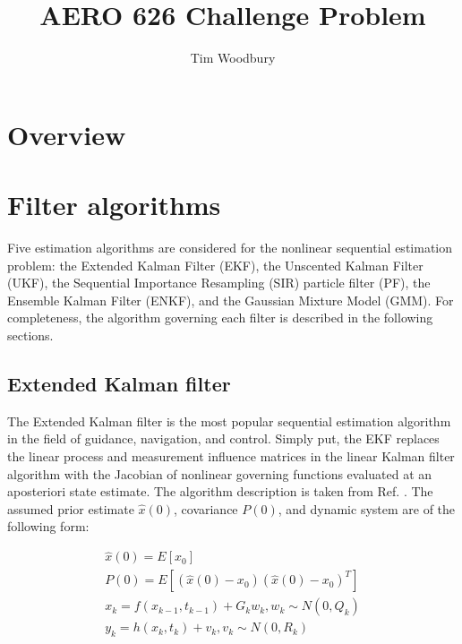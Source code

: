 \documentclass[]{article}
\title{AERO 626 Challenge Problem}
\author{Tim Woodbury}
\begin{document}


\maketitle

\section{Overview}

\section{Filter algorithms}

Five estimation algorithms are considered for the nonlinear sequential estimation problem: the Extended Kalman Filter (EKF), the Unscented Kalman Filter (UKF), the Sequential Importance Resampling (SIR) particle filter (PF), the Ensemble Kalman Filter (ENKF), and the Gaussian Mixture Model (GMM). For completeness, the algorithm governing each filter is described in the following sections.

\subsection{Extended Kalman filter}

The Extended Kalman filter is the most popular sequential estimation algorithm in the field of guidance, navigation, and control. Simply put, the EKF replaces the linear process and measurement influence matrices in the linear Kalman filter algorithm with the Jacobian of nonlinear governing functions evaluated at an aposteriori state estimate. The algorithm description is taken from Ref. \cite{crassidis}. The assumed prior estimate $\hat{x}(0)$, covariance $P(0)$, and dynamic system are of the following form:

\begin{align}
\hat{x}(0) = E[x_0] \\
P(0) = E[(\hat{x}(0)-x_0)(\hat{x}(0)-x_0)^T] \\
x_k = f(x_{k-1},t_{k-1}) + G_k w_k, w_k \sim N(0,Q_k) \\
y_k = h(x_k,t_k) + v_k, v_k \sim N(0,R_k)
\end{align}
\end{document}
